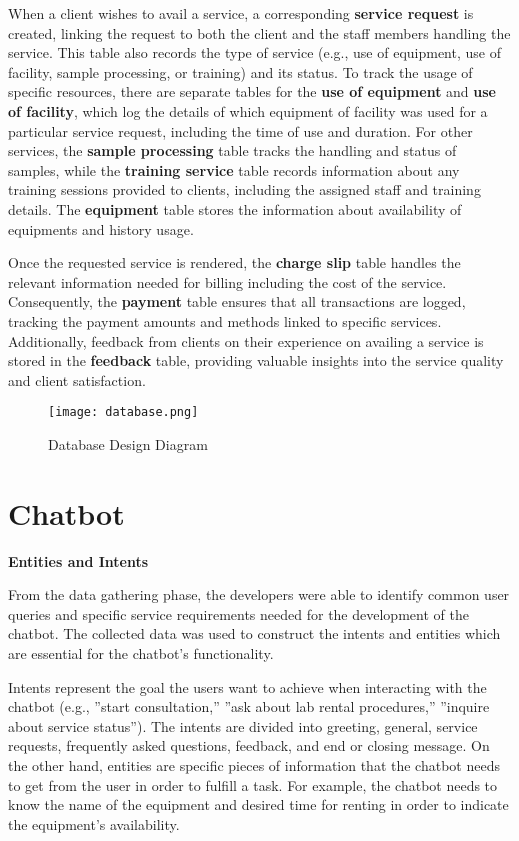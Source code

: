 When a client wishes to avail a service, a corresponding \textbf{service request} is created, linking the request to both the client and the staff members handling the service. This table also records the type of service (e.g., use of equipment, use of facility, sample processing, or training) and its status. To track the usage of specific resources, there are separate tables for the \textbf{use of equipment} and \textbf{use of facility}, which log the details of which equipment of facility was used for a particular service request, including the time of use and duration. For other services, the \textbf{sample processing} table tracks the handling and status of samples, while the \textbf{training service} table records information about any training sessions provided to clients, including the assigned staff and training details. The \textbf{equipment} table stores the information about availability of equipments and history usage. 

Once the requested service is rendered, the \textbf{charge slip} table handles the relevant information needed for billing including the cost of the service. Consequently, the \textbf{payment} table ensures that all transactions are logged, tracking the payment amounts and methods linked to specific services. Additionally, feedback from clients on their experience on availing a service is stored in the \textbf{feedback} table, providing valuable insights into the service quality and client satisfaction.

\begin{figure}[h]
	\centering 
	\texttt{[image: database.png]}
	\caption{Database Design Diagram}
	\label{fig:database}
\end{figure}

\newpage

\section{Chatbot}

\textbf{Entities and Intents}

From the data gathering phase, the developers were able to identify common user queries and specific service requirements needed for the development of the chatbot. The collected data was used to construct the intents and entities which are essential for the chatbot’s functionality. 

Intents represent the goal the users want to achieve when interacting with the chatbot (e.g., ”start consultation,” ”ask about lab rental procedures,” ”inquire about service status”). The intents are divided into greeting, general, service requests, frequently asked questions, feedback, and end or closing message. On the other hand, entities are specific pieces of information that the chatbot needs to get from the user in order to fulfill a task. For example, the chatbot needs to know the name of the equipment and desired time for renting in order to indicate the equipment's availability. 

